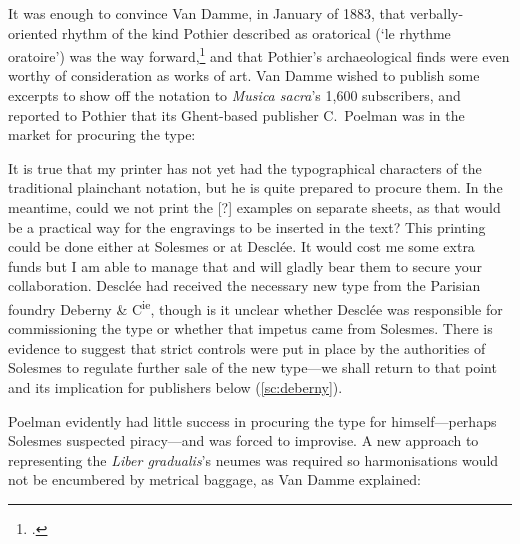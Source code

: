 It was enough to convince Van Damme, in January of 1883, that verbally-oriented rhythm of the kind Pothier described as oratorical (`le rhythme oratoire') was the way forward,\footcite[179]{Pothiermelodiesgregoriennesapres1880} and that Pothier's archaeological finds were even worthy of consideration as works of art.
Van Damme wished to publish some excerpts to show off the notation to \emph{Musica sacra}'s 1,600 subscribers, and reported to Pothier that its Ghent-based publisher C.\ Poelman was in the market for procuring the type:

  {}
{It is true that my printer has not yet had the typographical characters of the traditional plainchant notation, but he is quite prepared to procure them. In the meantime, could we not print the [?] examples on separate sheets, as that would be a practical way for the engravings to be inserted in the text? This printing could be done either at Solesmes or at Desclée. It would cost me some extra funds but I am able to manage that and will gladly bear them to secure your collaboration.}
\noindent
{}%
Desclée had received the necessary new type from the Parisian foundry Deberny \&{} C\textsuperscript{ie}, though is it unclear whether Desclée was responsible for commissioning the type or whether that impetus came from Solesmes.
There is evidence to suggest that strict controls were put in place by the authorities of Solesmes to regulate further sale of the new type---we shall return to that point and its implication for publishers below (\cref{sc:deberny}).
%

Poelman evidently had little success in procuring the type for himself---perhaps Solesmes suspected piracy---and was forced to improvise.
A new approach to representing the \emph{Liber gradualis}'s neumes was required so harmonisations would not be encumbered by metrical baggage, as Van Damme explained:
\pagebreak{}

